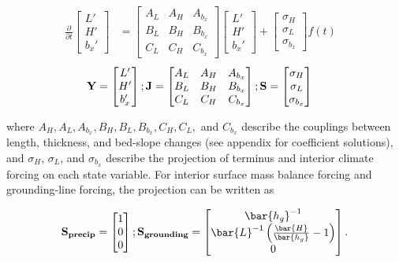 \documentclass[tc, manuscript]{copernicus}
\begin{document}
\begin{align}
\frac{\partial}{\partial t}
 \begin{bmatrix} L' \\ H' \\ b_x' \end{bmatrix}
 &=
  \begin{bmatrix}
   A_L & A_H & A_{b_x}  \\
   B_L & B_H& B_{b_x} \\
   C_L & C_H & C_{b_x}
   \end{bmatrix}
    \begin{bmatrix} L' \\ H' \\ b_x' \end{bmatrix}
    +
    \begin{bmatrix} \sigma_H \\  \sigma_L \\ \sigma_{b_x} \end{bmatrix} f(t)&
\end{align}
\begin{align}
\bf{Y} = 
 \begin{bmatrix} L' \\ H' \\ b_x' \end{bmatrix};
 \bf{J}=
  \begin{bmatrix}
   A_L & A_H & A_{b_x}  \\
   B_L & B_H& B_{b_x} \\
   C_L & C_H & C_{b_x}
   \end{bmatrix};
  \bf{S}=
    \begin{bmatrix} \sigma_H \\  \sigma_L \\ \sigma_{b_x} \end{bmatrix}&
\end{align}




where $A_H, A_L, A_{b_x}, B_H, B_L, B_{b_x}, C_H, C_L,$ and $C_{b_x}$ describe the couplings between length, thickness, and bed-slope changes (see appendix for coefficient solutions), and $\sigma_H$, $\sigma_L$, and $\sigma_{b_x}$ describe the projection of terminus and interior climate forcing on each state variable. For interior surface mass balance forcing and grounding-line forcing, the projection can be written as

\begin{align}
\bf{S}_{precip} =   \begin{bmatrix} 1 \\ 0 \\ 0 \end{bmatrix}; \space
\bf{S}_{grounding} =   \begin{bmatrix} \bar{h_g}^{-1} \\ \bar{L}^{-1}\left(\frac{\bar{H}}{\bar{h_g}}-1\right) \\ 0 \end{bmatrix}.
\end{align}
\end{document}
